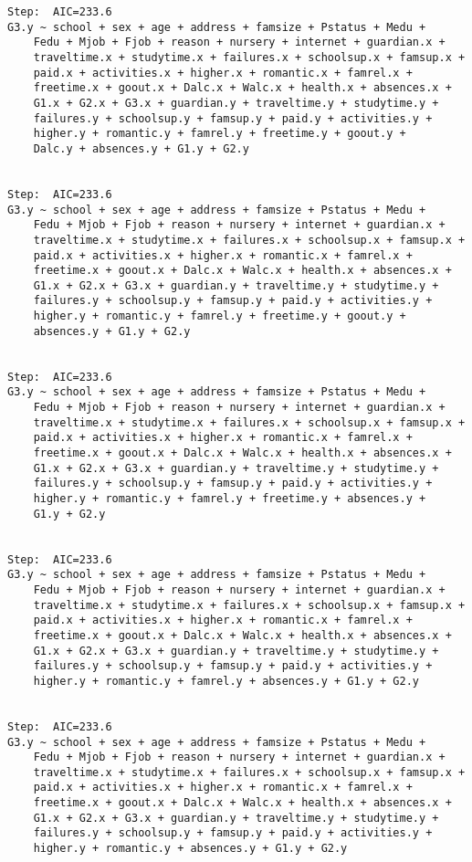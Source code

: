 \documentclass[11pt]{article}
\begin{document}
\begin{enumerate}
\begin{verbatim}
Step:  AIC=233.6
G3.y ~ school + sex + age + address + famsize + Pstatus + Medu + 
    Fedu + Mjob + Fjob + reason + nursery + internet + guardian.x + 
    traveltime.x + studytime.x + failures.x + schoolsup.x + famsup.x + 
    paid.x + activities.x + higher.x + romantic.x + famrel.x + 
    freetime.x + goout.x + Dalc.x + Walc.x + health.x + absences.x + 
    G1.x + G2.x + G3.x + guardian.y + traveltime.y + studytime.y + 
    failures.y + schoolsup.y + famsup.y + paid.y + activities.y + 
    higher.y + romantic.y + famrel.y + freetime.y + goout.y + 
    Dalc.y + absences.y + G1.y + G2.y


Step:  AIC=233.6
G3.y ~ school + sex + age + address + famsize + Pstatus + Medu + 
    Fedu + Mjob + Fjob + reason + nursery + internet + guardian.x + 
    traveltime.x + studytime.x + failures.x + schoolsup.x + famsup.x + 
    paid.x + activities.x + higher.x + romantic.x + famrel.x + 
    freetime.x + goout.x + Dalc.x + Walc.x + health.x + absences.x + 
    G1.x + G2.x + G3.x + guardian.y + traveltime.y + studytime.y + 
    failures.y + schoolsup.y + famsup.y + paid.y + activities.y + 
    higher.y + romantic.y + famrel.y + freetime.y + goout.y + 
    absences.y + G1.y + G2.y


Step:  AIC=233.6
G3.y ~ school + sex + age + address + famsize + Pstatus + Medu + 
    Fedu + Mjob + Fjob + reason + nursery + internet + guardian.x + 
    traveltime.x + studytime.x + failures.x + schoolsup.x + famsup.x + 
    paid.x + activities.x + higher.x + romantic.x + famrel.x + 
    freetime.x + goout.x + Dalc.x + Walc.x + health.x + absences.x + 
    G1.x + G2.x + G3.x + guardian.y + traveltime.y + studytime.y + 
    failures.y + schoolsup.y + famsup.y + paid.y + activities.y + 
    higher.y + romantic.y + famrel.y + freetime.y + absences.y + 
    G1.y + G2.y


Step:  AIC=233.6
G3.y ~ school + sex + age + address + famsize + Pstatus + Medu + 
    Fedu + Mjob + Fjob + reason + nursery + internet + guardian.x + 
    traveltime.x + studytime.x + failures.x + schoolsup.x + famsup.x + 
    paid.x + activities.x + higher.x + romantic.x + famrel.x + 
    freetime.x + goout.x + Dalc.x + Walc.x + health.x + absences.x + 
    G1.x + G2.x + G3.x + guardian.y + traveltime.y + studytime.y + 
    failures.y + schoolsup.y + famsup.y + paid.y + activities.y + 
    higher.y + romantic.y + famrel.y + absences.y + G1.y + G2.y


Step:  AIC=233.6
G3.y ~ school + sex + age + address + famsize + Pstatus + Medu + 
    Fedu + Mjob + Fjob + reason + nursery + internet + guardian.x + 
    traveltime.x + studytime.x + failures.x + schoolsup.x + famsup.x + 
    paid.x + activities.x + higher.x + romantic.x + famrel.x + 
    freetime.x + goout.x + Dalc.x + Walc.x + health.x + absences.x + 
    G1.x + G2.x + G3.x + guardian.y + traveltime.y + studytime.y + 
    failures.y + schoolsup.y + famsup.y + paid.y + activities.y + 
    higher.y + romantic.y + absences.y + G1.y + G2.y


\end{verbatim}
\end{enumerate}
\end{document}
